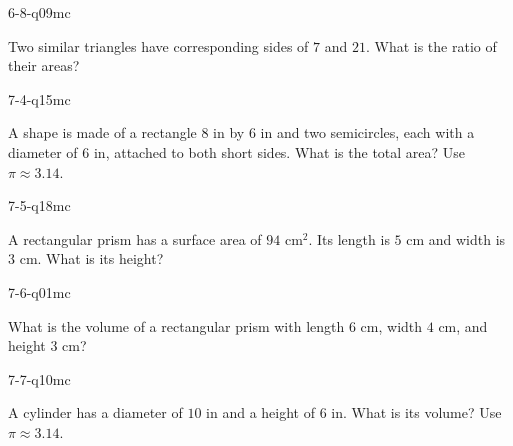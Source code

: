 \begin{practiceQuestion}{6-8-q09}{mc}
\begin{questionText}
Two similar triangles have corresponding sides of $7$ and $21$. What is the ratio of their areas?
\end{questionText}
\end{practiceQuestion}

\begin{practiceQuestion}{7-4-q15}{mc}
\begin{questionText}
A shape is made of a rectangle $8$ in by $6$ in and two semicircles, each with a diameter of $6$ in, attached to both short sides. What is the total area? Use $\pi \approx 3.14$.
\end{questionText}
\end{practiceQuestion}

\begin{practiceQuestion}{7-5-q18}{mc}
\begin{questionText}
A rectangular prism has a surface area of $94$ cm$^2$. Its length is $5$ cm and width is $3$ cm. What is its height?
\end{questionText}
\end{practiceQuestion}

\begin{practiceQuestion}{7-6-q01}{mc}
\begin{questionText}
What is the volume of a rectangular prism with length $6$ cm, width $4$ cm, and height $3$ cm?
\end{questionText}
\end{practiceQuestion}

\begin{practiceQuestion}{7-7-q10}{mc}
\begin{questionText}
A cylinder has a diameter of $10$ in and a height of $6$ in. What is its volume? Use $\pi \approx 3.14$.
\end{questionText}
\end{practiceQuestion}

